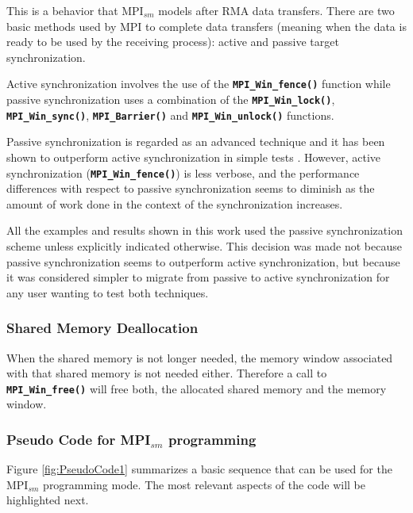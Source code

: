 This is a behavior that MPI$_{sm}$ models after RMA data transfers. There are two basic methods used by MPI to complete data transfers (meaning when the data is ready to be used by the receiving process): active and passive target synchronization. 

\medskip

Active synchronization involves the use of the \textbf{\texttt{MPI\_Win\_fence()}} function while passive synchronization uses a combination of the \textbf{\texttt{MPI\_Win\_lock()}}, \textbf{\texttt{MPI\_Win\_sync()}},  \textbf{\texttt{MPI\_Barrier()}} and \textbf{\texttt{MPI\_Win\_unlock()}} functions. 

\medskip

Passive synchronization is regarded as an advanced technique and it has been shown to outperform active synchronization in simple tests\cite{Samfass_2016} \cite{brinskiy2015}. However, active synchronization (\textbf{\texttt{MPI\_Win\_fence()}}) is less verbose, and the performance differences with respect to passive synchronization seems to diminish as the amount of work done in the context of the synchronization increases.

\medskip

All the examples and results shown in this work used the passive synchronization scheme unless explicitly indicated otherwise. This decision was made not because passive synchronization seems to outperform active synchronization, but because it was considered simpler to migrate from passive to active synchronization for any user wanting to test both techniques.

\subsubsection*{Shared Memory Deallocation}
When the shared memory is not longer needed, the memory window associated with that shared memory is not needed either. Therefore a call to \textbf{\texttt{MPI\_Win\_free()}} will free both, the allocated shared memory and the memory window.


\subsubsection*{Pseudo Code for MPI$_{sm}$ programming}

Figure \ref{fig:PseudoCode1} summarizes a basic sequence that can be used for the MPI$_{sm}$ programming mode. The most relevant aspects of the code will be highlighted next.


